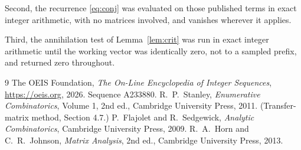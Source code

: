 \documentclass[11pt,a4paper]{article}
\theoremstyle{plain}
\theoremstyle{definition}
\begin{document}
Second, the recurrence \eqref{eq:conj} was evaluated on those published terms in exact
integer arithmetic, with no matrices involved, and vanishes wherever it applies.

Third, the annihilation test of Lemma~\ref{lem:crit} was run in exact integer arithmetic
until the working vector was identically zero, not to a sampled prefix, and returned zero
throughout.

\begin{thebibliography}{9}
 The OEIS Foundation, \emph{The On-Line Encyclopedia of Integer
Sequences}, \url{https://oeis.org}, 2026. Sequence A233880.
 R.~P.~Stanley, \emph{Enumerative Combinatorics}, Volume 1, 2nd ed.,
Cambridge University Press, 2011. (Transfer-matrix method, Section 4.7.)
 P.~Flajolet and R.~Sedgewick, \emph{Analytic Combinatorics}, Cambridge
University Press, 2009.
 R.~A.~Horn and C.~R.~Johnson, \emph{Matrix Analysis}, 2nd ed., Cambridge
University Press, 2013.
\end{thebibliography}
\end{document}
